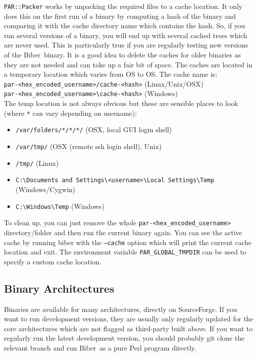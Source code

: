 \documentclass{ltxdockit}
\newcommand*{\biber}{Biber\xspace}
\begin{document}
\verb+PAR::Packer+ works by unpacking the required files to a cache
location. It only does this on the first run of a binary
by computing a hash of the binary and comparing it with
the cache directory name which contains the hash. So, if you run
several versions of a binary, you will end up with several cached
trees which are never used. This is particularly true if you are regularly
testing new versions of the \biber\ binary. It is a good idea to
delete the caches for older binaries as they are not needed and can take up
a fair bit of space. The caches are located in a temporary location which
varies from OS to OS. The cache name is:\\[1ex]

\noindent\verb+par-<hex_encoded_username>/cache-<hash>+ (Linux/Unix/OSX)\\
\verb+par-<hex_encoded_username>\cache-<hash>+ (Windows)\\[1ex]

\noindent The temp location is not always obvious but these are sensible
places to look (where \verb+*+ can vary depending on username):

\begin{itemize}
\item \verb+/var/folders/*/*/*/+ (OSX, local GUI login shell)
\item \verb+/var/tmp/+ (OSX (remote ssh login shell), Unix)
\item \verb+/tmp/+ (Linux)
\item \verb+C:\Documents and Settings\<username>\Local Settings\Temp+ (Windows/Cygwin)
\item \verb+C:\Windows\Temp+ (Windows)
\end{itemize}

\noindent To clean up, you can just remove the whole \verb+par-<hex_encoded_username>+
directory/folder and then run the current binary again. You can see the active
cache by running biber with the \texttt{--cache} option which will print the
current cache location and exit. The environment variable
\verb+PAR_GLOBAL_TMPDIR+ can be used to specify a custom cache location.

\subsection{Binary Architectures}

Binaries are available for many architectures, directly on SourceForge. If
you want to run development versions, they are usually only regularly
updated for the core architectures which are not flagged as third-party
built above. If you want to regularly run the latest development version,
you should probably git clone the relevant branch and run \biber\ as a pure
Perl program directly.
\end{document}
